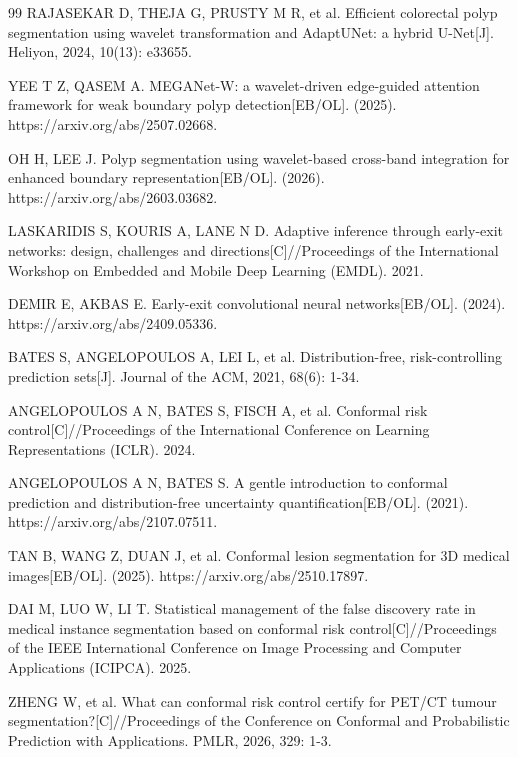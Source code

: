 \documentclass[conference]{IEEEtran}
\begin{document}
\begin{thebibliography}{99}
RAJASEKAR D, THEJA G, PRUSTY M R, et al. Efficient colorectal polyp segmentation using wavelet transformation and AdaptUNet: a hybrid U-Net[J]. Heliyon, 2024, 10(13): e33655.

YEE T Z, QASEM A. MEGANet-W: a wavelet-driven edge-guided attention framework for weak boundary polyp detection[EB/OL]. (2025). https://arxiv.org/abs/2507.02668.

OH H, LEE J. Polyp segmentation using wavelet-based cross-band integration for enhanced boundary representation[EB/OL]. (2026). https://arxiv.org/abs/2603.03682.

LASKARIDIS S, KOURIS A, LANE N D. Adaptive inference through early-exit networks: design, challenges and directions[C]//Proceedings of the International Workshop on Embedded and Mobile Deep Learning (EMDL). 2021.

DEMIR E, AKBAS E. Early-exit convolutional neural networks[EB/OL]. (2024). https://arxiv.org/abs/2409.05336.

BATES S, ANGELOPOULOS A, LEI L, et al. Distribution-free, risk-controlling prediction sets[J]. Journal of the ACM, 2021, 68(6): 1-34.

ANGELOPOULOS A N, BATES S, FISCH A, et al. Conformal risk control[C]//Proceedings of the International Conference on Learning Representations (ICLR). 2024.

ANGELOPOULOS A N, BATES S. A gentle introduction to conformal prediction and distribution-free uncertainty quantification[EB/OL]. (2021). https://arxiv.org/abs/2107.07511.

TAN B, WANG Z, DUAN J, et al. Conformal lesion segmentation for 3D medical images[EB/OL]. (2025). https://arxiv.org/abs/2510.17897.

DAI M, LUO W, LI T. Statistical management of the false discovery rate in medical instance segmentation based on conformal risk control[C]//Proceedings of the IEEE International Conference on Image Processing and Computer Applications (ICIPCA). 2025.

ZHENG W, et al. What can conformal risk control certify for PET/CT tumour segmentation?[C]//Proceedings of the Conference on Conformal and Probabilistic Prediction with Applications. PMLR, 2026, 329: 1-3.


\end{thebibliography}
\end{document}
